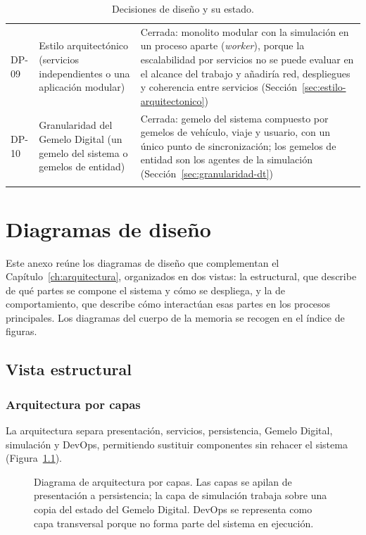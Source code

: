 \begin{longtable}{@{}>{\raggedright\arraybackslash}p{1.30cm} >{\raggedright\arraybackslash}p{5.90cm} >{\raggedright\arraybackslash}p{7.20cm}@{}}
    DP-09 & Estilo arquitectónico (servicios independientes o una aplicación modular) & Cerrada: monolito modular con la simulación en un proceso aparte (\textit{worker}), porque la escalabilidad por servicios no se puede evaluar en el alcance del trabajo y añadiría red, despliegues y coherencia entre servicios (Sección~\ref{sec:estilo-arquitectonico}) \\
    DP-10 & Granularidad del Gemelo Digital (un gemelo del sistema o gemelos de entidad) & Cerrada: gemelo del sistema compuesto por gemelos de vehículo, viaje y usuario, con un único punto de sincronización; los gemelos de entidad son los agentes de la simulación (Sección~\ref{sec:granularidad-dt}) \\
    \hline
  \caption{Decisiones de diseño y su estado.}
  \label{tab:decisiones-pendientes}
\end{longtable}

\chapter{Diagramas de diseño}
\label{anx:diagramas}

Este anexo reúne los diagramas de diseño que complementan el Capítulo~\ref{ch:arquitectura}, organizados en dos vistas: la estructural, que describe de qué partes se compone el sistema y cómo se despliega, y la de comportamiento, que describe cómo interactúan esas partes en los procesos principales. Los diagramas del cuerpo de la memoria se recogen en el índice de figuras.

\section{Vista estructural}
\label{sec:anx-vista-estructural}

\subsection{Arquitectura por capas}
\label{sec:anx-arquitectura-capas}

La arquitectura separa presentación, servicios, persistencia, Gemelo Digital, simulación y DevOps, permitiendo sustituir componentes sin rehacer el sistema (Figura~\ref{fig:arquitectura-capas}).

\begin{figure}[H]
  \centering
  
  \caption[Diagrama de arquitectura por capas]{Diagrama de arquitectura por capas. Las capas se apilan de presentación a persistencia; la capa de simulación trabaja sobre una copia del estado del Gemelo Digital. DevOps se representa como capa transversal porque no forma parte del sistema en ejecución.}
  \label{fig:arquitectura-capas}
\end{figure}

